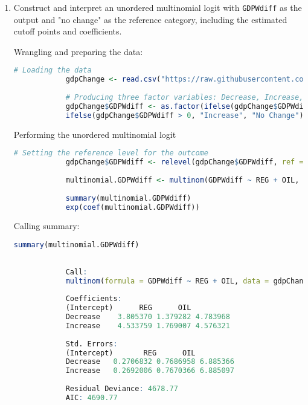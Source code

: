 \documentclass[12pt,letterpaper]{article}
\begin{document}
	\begin{enumerate}
		\item Construct and interpret an unordered multinomial logit with \texttt{GDPWdiff} as the output and "no change" as the reference category, including the estimated cutoff points and coefficients.
		
		\vspace{.2cm}
		
		Wrangling and preparing the data:
		\begin{lstlisting}[language=R]	
			# Loading the data
			gdpChange <- read.csv("https://raw.githubusercontent.com/ASDS-TCD/StatsII_Spring2023/main/datasets/gdpChange.csv")
			
			# Producing three factor variables: Decrease, Increase, and No Change
			gdpChange$GDPWdiff <- as.factor(ifelse(gdpChange$GDPWdiff < 0, "Decrease",
			ifelse(gdpChange$GDPWdiff > 0, "Increase", "No Change")))
		\end{lstlisting}
		
		\vspace{.35cm}
		
		Performing the unordered multinomial logit
		\begin{lstlisting}[language=R]
			# Setting the reference level for the outcome
			gdpChange$GDPWdiff <- relevel(gdpChange$GDPWdiff, ref = "No Change")
			
			multinomial.GDPWdiff <- multinom(GDPWdiff ~ REG + OIL, data = gdpChange)
			
			summary(multinomial.GDPWdiff)
			exp(coef(multinomial.GDPWdiff))
		\end{lstlisting}
		
		\vspace{.35cm}
		
		Calling summary:
		\begin{lstlisting}[language=R]
			summary(multinomial.GDPWdiff)
			
			
			Call:
			multinom(formula = GDPWdiff ~ REG + OIL, data = gdpChange)
			
			Coefficients:
			(Intercept)      REG      OIL
			Decrease    3.805370 1.379282 4.783968
			Increase    4.533759 1.769007 4.576321
			
			Std. Errors:
			(Intercept)       REG      OIL
			Decrease   0.2706832 0.7686958 6.885366
			Increase   0.2692006 0.7670366 6.885097
			
			Residual Deviance: 4678.77 
			AIC: 4690.77 
		\end{lstlisting}
		

\end{enumerate}
\end{document}
